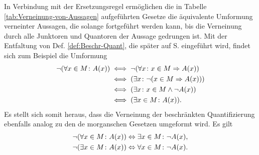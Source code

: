 In Verbindung mit der Ersetzungsregel ermöglichen die in Tabelle
\ref{tab:Verneinung-von-Aussagen} aufgeführten Gesetze die
äquivalente Umformung verneinter Aussagen, die solange fortgeführt
werden kann, bis die Verneinung durch alle Junktoren und Quantoren
der Aussage gedrungen ist. Mit der Entfaltung von Def.
\ref{def:Beschr-Quant}, die später auf S. \pageref{def:Beschr-Quant}
eingeführt wird, findet sich zum Beispiel die Umformung
\begin{align*}
\lnot(\forall x\in M\colon A(x))
&\iff \lnot(\forall x\colon x\in M\Rightarrow A(x))\\
&\iff (\exists x\colon\lnot (x\in M\Rightarrow A(x)))\\
&\iff (\exists x\colon x\in M\land\lnot A(x))\\
&\iff (\exists x\in M\colon A(x)).
\end{align*}
Es stellt sich somit heraus, dass die Verneinung der beschränkten
Quantifizierung ebenfalls analog zu den de morganschen Gesetzen
umgeformt wird. Es gilt
\begin{align*}
\lnot(\forall x\in M\colon A(x)) &\Leftrightarrow \exists x\in M\colon \lnot A(x),\\
\lnot(\exists x\in M\colon A(x)) &\Leftrightarrow \forall x\in M\colon \lnot A(x).
\end{align*}


